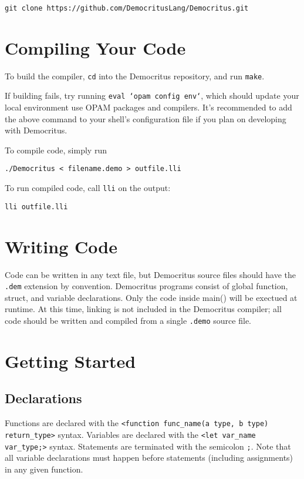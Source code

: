 	\begin{lstlisting}
git clone https://github.com/DemocritusLang/Democritus.git
	\end{lstlisting}


\section{Compiling Your Code}
	
	To build the compiler, \texttt{cd} into the Democritus repository, and run \texttt{make}.

	\medskip \noindent
	If building fails, try running \texttt{eval `opam config env`}, which should update your local environment use OPAM packages and compilers. It's recommended to add the above command to your shell's configuration file if you plan on developing with Democritus.

	\medskip \noindent
	To compile code, simply run
	\begin{lstlisting}
./Democritus < filename.demo > outfile.lli
	\end{lstlisting}

	\noindent To run compiled code, call \texttt{lli} on the output:
	\begin{lstlisting}
lli outfile.lli
	\end{lstlisting}

\section{Writing Code}

	Code can be written in any text file, but Democritus source files should have the \texttt{.dem} extension by convention. Democritus programs consist of global function, struct, and variable declarations. Only the code inside main() will be exectued at runtime. At this time, linking is not included in the Democritus compiler; all code should be written and compiled from a single \texttt{.demo} source file.

\section{Getting Started}

	\subsection{Declarations}
	Functions are declared with the \texttt{<function func\_name(a type, b type) return\_type>} syntax. Variables are declared with the \texttt{<let var\_name var\_type;>} syntax. Statements are terminated with the semicolon \texttt{;}. Note that all variable declarations must happen before statements (including assignments) in any given function.

